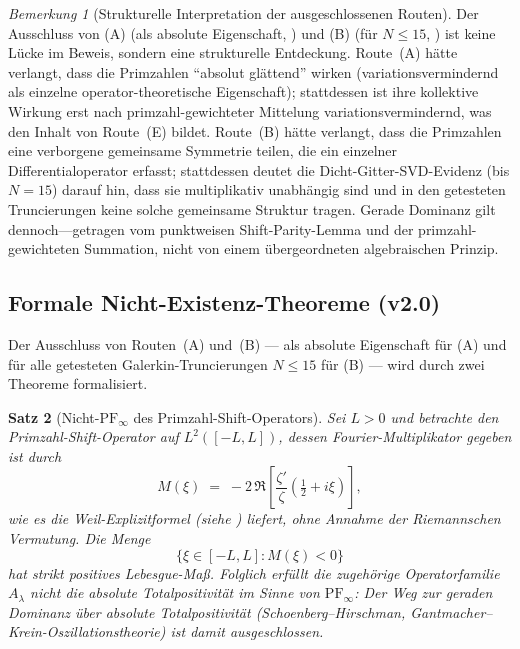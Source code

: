 ﻿\documentclass[12pt,a4paper]{article}
\newtheorem{theorem}{Satz}[section]
\theoremstyle{definition}
\theoremstyle{remark}
\newtheorem{remark}[theorem]{Bemerkung}
\begin{document}
\begin{remark}[Strukturelle Interpretation der ausgeschlossenen Routen]
Der Ausschluss von (A) (als absolute Eigenschaft, ) und (B) (für $N \leq 15$, ) ist keine Lücke im Beweis, sondern eine strukturelle Entdeckung. Route~(A) hätte verlangt, dass die Primzahlen ``absolut glättend'' wirken (variationsvermindernd als einzelne operator-theoretische Eigenschaft); stattdessen ist ihre kollektive Wirkung erst nach primzahl-gewichteter Mittelung variationsvermindernd, was den Inhalt von Route~(E) bildet. Route~(B) hätte verlangt, dass die Primzahlen eine verborgene gemeinsame Symmetrie teilen, die ein einzelner Differentialoperator erfasst; stattdessen deutet die Dicht-Gitter-SVD-Evidenz (bis $N = 15$) darauf hin, dass sie multiplikativ unabhängig sind und in den getesteten Truncierungen keine solche gemeinsame Struktur tragen. Gerade Dominanz gilt dennoch---getragen vom punktweisen Shift-Parity-Lemma und der primzahl-gewichteten Summation, nicht von einem übergeordneten algebraischen Prinzip.
\end{remark}

\subsection{Formale Nicht-Existenz-Theoreme (v2.0)}
\label{sec:nonexistence-de}

Der Ausschluss von Routen~(A) und~(B) --- als absolute Eigenschaft für (A) und für alle getesteten Galerkin-Truncierungen $N \leq 15$ für (B) --- wird durch zwei Theoreme formalisiert.

\begin{theorem}[Nicht-$\mathrm{PF}_\infty$ des Primzahl-Shift-Operators]\label{thm:NE-A}
Sei $L > 0$ und betrachte den Primzahl-Shift-Operator auf $L^2([-L,L])$, dessen Fourier-Multiplikator gegeben ist durch
\[
  M(\xi) \;=\; -2\,\Re\!\left[\frac{\zeta'}{\zeta}\!\left(\tfrac{1}{2}+i\xi\right)\right],
\]
wie es die Weil-Explizitformel (siehe \cite{Connes2026}) liefert, ohne Annahme der Riemannschen Vermutung. Die Menge
\[
  \{\xi \in [-L,L] : M(\xi) < 0\}
\]
hat strikt positives Lebesgue-Maß. Folglich erfüllt die zugehörige Operatorfamilie $A_\lambda$ nicht die absolute Totalpositivität im Sinne von $\mathrm{PF}_\infty$: Der Weg zur geraden Dominanz über absolute Totalpositivität (Schoenberg--Hirschman, Gantmacher--Krein-Oszillationstheorie) ist damit ausgeschlossen.
\end{theorem}
\end{document}
